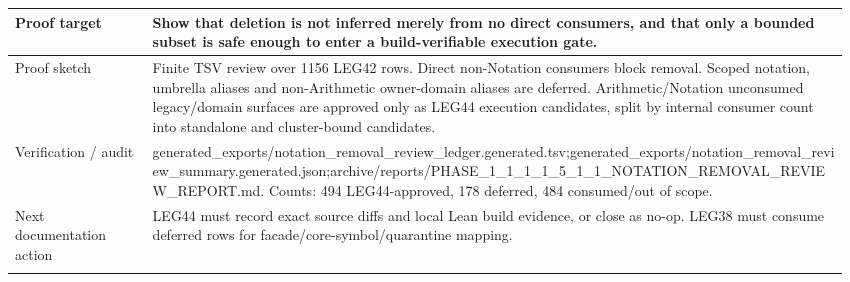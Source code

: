 \begin{longtable}{L{0.16\linewidth} L{0.81\linewidth}}
\hline\addlinespace[0.20em]
Proof target & Show that deletion is not inferred merely from no direct consumers, and that only a bounded subset is safe enough to enter a build-verifiable execution gate.\\
\hline\addlinespace[0.20em]
Proof sketch & Finite TSV review over 1156 LEG42 rows. Direct non-Notation consumers block removal. Scoped notation, umbrella aliases and non-Arithmetic owner-domain aliases are deferred. Arithmetic/\allowbreak{}Notation unconsumed legacy/\allowbreak{}domain surfaces are approved only as LEG44 execution candidates, split by internal consumer count into standalone and cluster-bound candidates.\\
\hline\addlinespace[0.20em]
Verification /\allowbreak{} audit & generated\_exports/\allowbreak{}notation\_removal\_review\_ledger.generated.tsv;\newline generated\_exports/\allowbreak{}notation\_removal\_review\_summary.generated.json;\newline archive/\allowbreak{}reports/\allowbreak{}PHASE\_1\_1\_1\_1\_5\_1\_1\_NOTATION\_REMOVAL\_REVIEW\_REPORT.md. Counts: 494 LEG44-approved, 178 deferred, 484 consumed/\allowbreak{}out of scope.\\
\hline\addlinespace[0.20em]
Next documentation action & LEG44 must record exact source diffs and local Lean build evidence, or close as no-op. LEG38 must consume deferred rows for facade/\allowbreak{}core-symbol/\allowbreak{}quarantine mapping.\\
\hline\addlinespace[0.20em]
\end{longtable}

